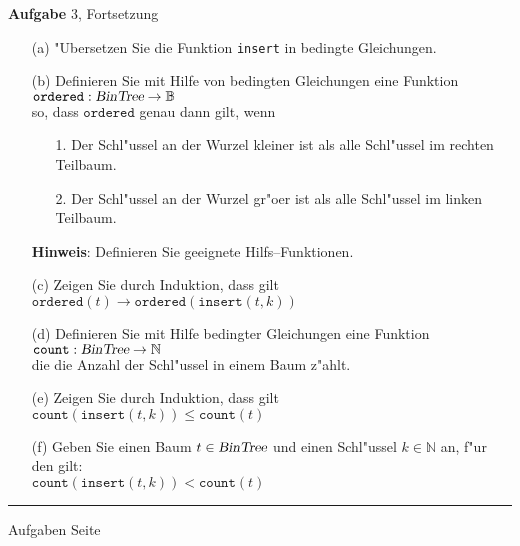 \begin{slide}{}
\normalsize

\footnotesize
\textbf{Aufgabe} 3, Fortsetzung
\begin{enumerate}
\item[(a)] "Ubersetzen Sie die Funktion \texttt{insert} in bedingte Gleichungen.
\item[(b)] Definieren Sie mit Hilfe von bedingten Gleichungen eine Funktion \\[0.3cm]
           \hspace*{1.3cm} $\texttt{ordered}: \textsl{BinTree} \rightarrow \mathbb{B}$ \\[0.3cm]
           so, dass $\texttt{ordered}$ genau dann gilt, wenn
           \begin{enumerate}
           \item[1.] Der Schl"ussel an der Wurzel kleiner ist als alle Schl"ussel im
                 rechten Teilbaum.
           \item[2.] Der Schl"ussel an der Wurzel gr"o\3er ist als alle Schl"ussel im
                 linken Teilbaum.
           \end{enumerate}
           \textbf{Hinweis}: Definieren Sie geeignete Hilfs--Funktionen.
\item[(c)] Zeigen Sie durch Induktion, dass gilt  \\[0.3cm]
            \hspace*{1.3cm}             $\mathtt{ordered}(t) \rightarrow
\mathtt{ordered}(\mathtt{insert}(t,k))$
\item[(d)] Definieren Sie mit Hilfe bedingter Gleichungen eine Funktion \\[0.3cm]
           \hspace*{1.3cm} $\texttt{count}: \textsl{BinTree} \rightarrow \mathbb{N}$ \\[0.3cm]
           die die Anzahl der Schl"ussel in einem Baum z"ahlt.
\item[(e)] Zeigen Sie durch Induktion, dass gilt  \\[0.3cm]
           \hspace*{1.3cm} $\mathtt{count}(\mathtt{insert}(t,k)) \leq \mathtt{count}(t)$
\item[(f)] Geben Sie einen Baum $t \in \textsl{BinTree}$ und einen Schl"ussel 
           $k \in \mathbb{N}$ an, f"ur den gilt: \\[0.3cm]
           \hspace*{1.3cm} $\mathtt{count}(\mathtt{insert}(t,k)) < \mathtt{count}(t)$
\end{enumerate}

\vspace*{\fill}
\tiny \addtocounter{mypage}{1}
\rule{17cm}{1mm}
Aufgaben  \hspace*{\fill} Seite 
\end{slide}

